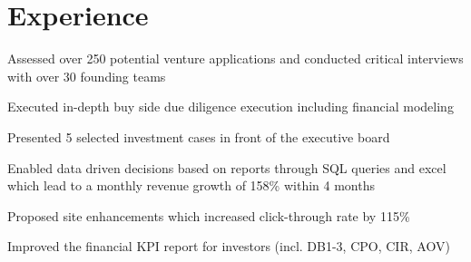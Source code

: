 \documentclass[letterpaper]{deedy-resume} %
\begin{document}
\begin{minipage}[t]{0.66\textwidth} %


\section{Experience}


\vspace{\topsep} %
\begin{tightitemize}
\item Assessed over 250 potential venture applications and conducted critical interviews with over 30 founding teams
\item Executed in-depth buy side due diligence execution including financial modeling
\item Presented 5 selected investment cases in front of the executive board
\end{tightitemize}

\sectionspace %



\begin{tightitemize}
\item Enabled data driven decisions based on reports through SQL queries and excel which lead to a monthly revenue growth of 158\% within 4 months
\item Proposed site enhancements which increased click-through rate by 115\%
\item Improved the financial KPI report for investors (incl. DB1-3, CPO, CIR, AOV)
\end{tightitemize}

\sectionspace %




\end{minipage}
\end{document}
